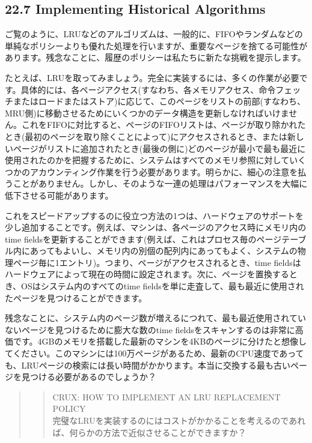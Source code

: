 \hypertarget{implementing-historical-algorithms}{%
\subsection*{22.7 Implementing Historical
Algorithms}\label{implementing-historical-algorithms}}

ご覧のように、LRUなどのアルゴリズムは、一般的に、FIFOやランダムなどの単純なポリシーよりも優れた処理を行いますが、重要なページを捨てる可能性があります。残念なことに、履歴のポリシーは私たちに新たな挑戦を提示します。

たとえば、LRUを取ってみましょう。完全に実装するには、多くの作業が必要です。具体的には、各ページアクセス(すなわち、各メモリアクセス、命令フェッチまたはロードまたはストア)に応じて、このページをリストの前部(すなわち、MRU側)に移動させるためにいくつかのデータ構造を更新しなければいけません。これをFIFOに対比すると、ページのFIFOリストは、ページが取り除かれたとき(最初のページを取り除くことによって)にアクセスされるとき、または新しいページがリストに追加されたとき(最後の側に)どのページが最小で最も最近に使用されたのかを把握するために、システムはすべてのメモリ参照に対していくつかのアカウンティング作業を行う必要があります。明らかに、細心の注意を払うことがありません。しかし、そのような一連の処理はパフォーマンスを大幅に低下させる可能があります。

これをスピードアップするのに役立つ方法の1つは、ハードウェアのサポートを少し追加することです。例えば、マシンは、各ページのアクセス時にメモリ内のtime
fieldsを更新することができます(例えば、これはプロセス毎のページテーブル内にあってもよいし、メモリ内の別個の配列内にあってもよく、システムの物理ページ毎に1エントリ)。つまり、ページがアクセスされるとき、time
fieldsはハードウェアによって現在の時間に設定されます。次に、ページを置換するとき、OSはシステム内のすべてのtime
fieldsを単に走査して、最も最近に使用されたページを見つけることができます。

残念なことに、システム内のページ数が増えるにつれて、最も最近使用されていないページを見つけるために膨大な数のtime
fieldsをスキャンするのは非常に高価です。4GBのメモリを搭載した最新のマシンを4KBのページに分けたと想像してください。このマシンには100万ページがあるため、最新のCPU速度であっても、LRUページの検索には長い時間がかかります。本当に交換する最も古いページを見つける必要があるのでしょうか？

\begin{quote}
\begin{quote}
CRUX: HOW TO IMPLEMENT AN LRU REPLACEMENT POLICY\\
完璧なLRUを実装するのにはコストがかかることを考えるのであれば、何らかの方法で近似させることができますか？
\end{quote}
\end{quote}

